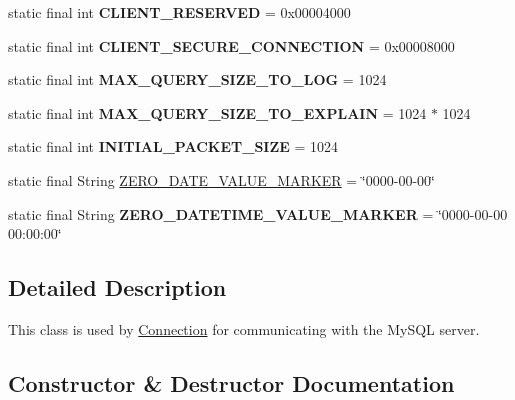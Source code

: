 \begin{DoxyCompactItemize}
static final int {\bfseries C\+L\+I\+E\+N\+T\+\_\+\+R\+E\+S\+E\+R\+V\+ED} = 0x00004000
\item 
\mbox{\label{classcom_1_1mysql_1_1jdbc_1_1_mysql_i_o_a78814a687c993427e89c52d4a3a99316}} 
static final int {\bfseries C\+L\+I\+E\+N\+T\+\_\+\+S\+E\+C\+U\+R\+E\+\_\+\+C\+O\+N\+N\+E\+C\+T\+I\+ON} = 0x00008000
\item 
\mbox{\label{classcom_1_1mysql_1_1jdbc_1_1_mysql_i_o_a2d2cccf3256820469cfc6597e74d10af}} 
static final int {\bfseries M\+A\+X\+\_\+\+Q\+U\+E\+R\+Y\+\_\+\+S\+I\+Z\+E\+\_\+\+T\+O\+\_\+\+L\+OG} = 1024
\item 
\mbox{\label{classcom_1_1mysql_1_1jdbc_1_1_mysql_i_o_aa14027c67779bce159810d8d96ed2a37}} 
static final int {\bfseries M\+A\+X\+\_\+\+Q\+U\+E\+R\+Y\+\_\+\+S\+I\+Z\+E\+\_\+\+T\+O\+\_\+\+E\+X\+P\+L\+A\+IN} = 1024 $\ast$ 1024
\item 
\mbox{\label{classcom_1_1mysql_1_1jdbc_1_1_mysql_i_o_a2769548a27fa2dbafdc5a7bdbfee7fd0}} 
static final int {\bfseries I\+N\+I\+T\+I\+A\+L\+\_\+\+P\+A\+C\+K\+E\+T\+\_\+\+S\+I\+ZE} = 1024
\item 
static final String \mbox{\hyperlink{classcom_1_1mysql_1_1jdbc_1_1_mysql_i_o_ab97d65895f0cd8157dd3f39c968eee68}{Z\+E\+R\+O\+\_\+\+D\+A\+T\+E\+\_\+\+V\+A\+L\+U\+E\+\_\+\+M\+A\+R\+K\+ER}} = \char`\"{}0000-\/00-\/00\char`\"{}
\item 
\mbox{\label{classcom_1_1mysql_1_1jdbc_1_1_mysql_i_o_a8ee301b64234289e02e2635167aa8522}} 
static final String {\bfseries Z\+E\+R\+O\+\_\+\+D\+A\+T\+E\+T\+I\+M\+E\+\_\+\+V\+A\+L\+U\+E\+\_\+\+M\+A\+R\+K\+ER} = \char`\"{}0000-\/00-\/00 00\+:00\+:00\char`\"{}
\end{DoxyCompactItemize}


\subsection{Detailed Description}
This class is used by \mbox{\hyperlink{interfacecom_1_1mysql_1_1jdbc_1_1_connection}{Connection}} for communicating with the My\+S\+QL server. 

\subsection{Constructor \& Destructor Documentation}
\mbox{\label{classcom_1_1mysql_1_1jdbc_1_1_mysql_i_o_a9b4e102e11948b0b76701c1c3ce3a4a9}} 
